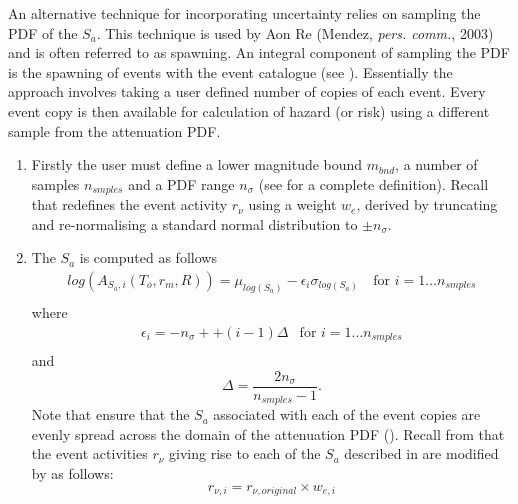 An alternative technique for incorporating uncertainty relies on
sampling the PDF of the $S_a$. This technique is used by Aon Re
(Mendez, \textit{pers. comm.}, 2003) and is often referred to as
spawning. An integral component of sampling the PDF is the spawning
of events with the event catalogue (see ).
Essentially the approach involves taking a user defined number of
copies of each event. Every event copy is then available for
calculation of hazard (or risk) using a different sample from the
attenuation PDF.
\begin{enumerate}
\item Firstly the user must define a lower magnitude bound
$m_{bnd}$, a number of samples $n_{smples}$ and a PDF range
$n_\sigma$ (see  for a complete definition).
Recall that  redefines the event activity
$r_\nu$ using a weight $w_e$, derived by truncating and
re-normalising a standard normal distribution to $\pm n_\sigma$.
\item The $S_a$ is computed as follows
\begin{equation}
\label{attn:uncertainty-pdfsample}
\begin{array}{ll}
log(A_{S_a,i}(T_o,r_m,R)) = \mu_{log(S_a)} - \epsilon_i
\sigma_{log(S_a)}\ & \textrm{for $i=1 \ldots
n_{smples}$} \\
\end{array}
\end{equation}
where
\begin{equation}
\label{attn:uncertainty-def-epsilon}
\begin{array}{ll}
\epsilon_i = -n_\sigma + + (i-1)\Delta &
\textrm{for $i=1 \ldots n_{smples}$} \\
\end{array}
\end{equation}
and
\begin{equation}
\Delta = \frac{2n_\sigma}{n_{smples}-1}.
\end{equation}
Note that
ensure that the $S_a$ associated with each of the event copies are
evenly spread across the domain of the attenuation PDF
(). Recall from 
that the event activities $r_\nu$ giving rise to each of the $S_a$
described in  are modified by
 as follows:
\begin{equation}
r_{\nu,i} = r_{\nu,original} \times w_{e,i}
\end{equation}
\end{enumerate}

